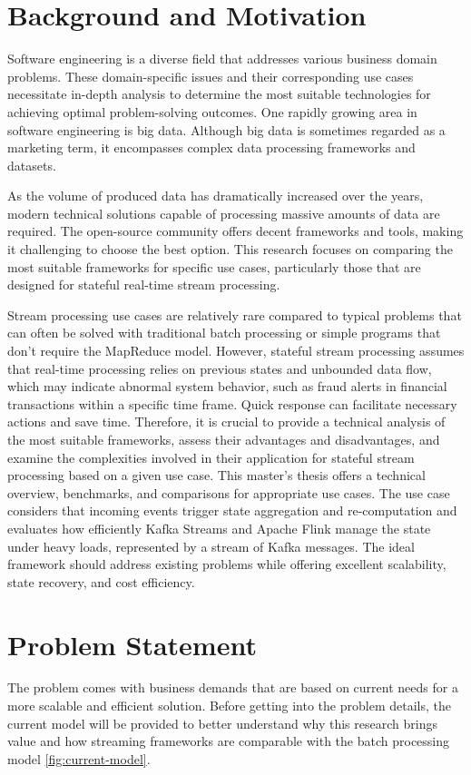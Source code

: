 \section{Background and Motivation}\label{sec:back-and-motiv}
Software engineering is a diverse field that addresses various business domain problems.
These domain-specific issues and their corresponding use cases necessitate in-depth analysis to determine the most suitable technologies for achieving optimal problem-solving outcomes.
One rapidly growing area in software engineering is big data.
Although big data is sometimes regarded as a marketing term, it encompasses complex data processing frameworks and datasets.

As the volume of produced data has dramatically increased over the years, modern technical solutions capable of processing massive amounts of data are required.
The open-source community offers decent frameworks and tools, making it challenging to choose the best option.
This research focuses on comparing the most suitable frameworks for specific use cases, particularly those that are designed for stateful real-time stream processing.

Stream processing use cases are relatively rare compared to typical problems that can often
be solved with traditional batch processing or simple programs that don't require the MapReduce model.
However, stateful stream processing assumes that real-time processing relies on previous states and unbounded data flow, which may indicate abnormal system behavior, such as fraud alerts in financial transactions
within a specific time frame.
Quick response can facilitate necessary actions and save time.
Therefore, it is crucial to provide a technical analysis of the most suitable frameworks, assess their advantages and disadvantages, and examine the complexities involved in their application for stateful stream processing based on a given use case.
This master's thesis offers a technical overview, benchmarks, and comparisons for appropriate use cases.
The use case considers that incoming events trigger state aggregation and re-computation and evaluates how efficiently Kafka Streams \cite{kafka_streams_intro} and Apache Flink \cite{flink_intro} manage the state under heavy loads, represented by a stream of Kafka \cite{kafka_intro} messages.
The ideal framework should address existing problems while offering excellent scalability, state recovery, and cost efficiency.

\newpage
\section{Problem Statement}\label{sec:prob-st}
The problem comes with business demands that are based on current needs for a more scalable and efficient solution.
Before getting into the problem details, the current model will be provided to better understand why this research
brings value and how streaming frameworks are comparable with the batch processing model \ref{fig:current-model}.

